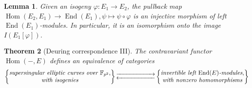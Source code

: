 \documentclass[10pt]{article}
\theoremstyle{plain}
\newtheorem{theorem}{Theorem}
\newtheorem{lemma}[theorem]{Lemma}
\theoremstyle{definition}
\DeclareMathOperator{\End}{End} %
\DeclareMathOperator{\Hom}{Hom} %
\def\F{\ensuremath{\mathbb{F}}}
\begin{document}

\begin{lemma}
    Given an isogeny $\varphi:E_1\to E_2$, the pullback map
    $\Hom(E_2,E_1)\to\End(E_1), \psi\mapsto \psi\circ\varphi$
    is an injective morphism of left $\End(E_1)$-modules.
    In particular, it is an isomorphism onto the image $I(E_1[\varphi])$.
\end{lemma}

\begin{theorem}[Deuring correspondence III] 
    The contravariant functor $\Hom(-,E)$
    defines an equivalence of categories
    \begin{equation*}
        \left\{
            \begin{tabular}{@{} c @{}}
                \emph{supersingular elliptic curves over $\F_{p^2}$}, \\
                \emph{with isogenies}
            \end{tabular}
        \right\}
        \begin{gathered}
            \overset{}{\xrightarrow{\hspace*{2cm}}} \\[-2ex]
            \underset{}{\xleftarrow{\hspace*{2cm}}}
        \end{gathered}
        \left\{
            \begin{tabular}{@{} c @{}}
                \emph{invertible left $\End(E)$-modules}, \\
                \emph{with nonzero homomorphisms}
            \end{tabular}
        \right\}
    \end{equation*}
\end{theorem}
\end{document}
